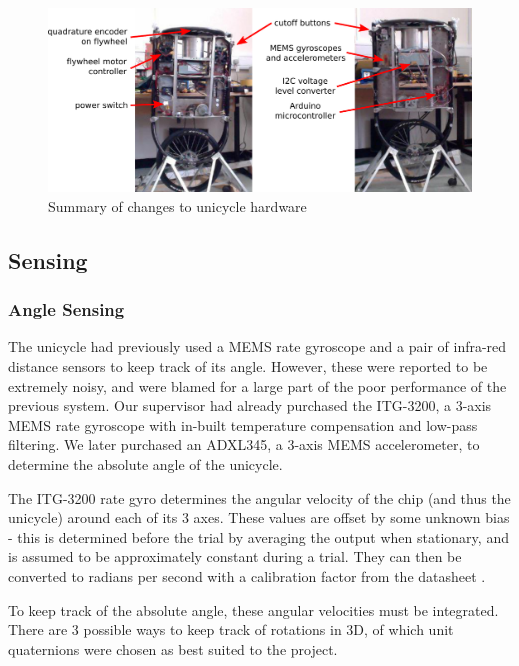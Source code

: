 \documentclass{IIBproject}
\begin{document}
\begin{figure}[htpb]
  \begin{center}
    \includegraphics[width=15cm]{figures/hardware.pdf}
    \end{center}
    \caption{Summary of changes to unicycle hardware}
    \label{fig:hardware}
    \end{figure}

\subsection{Sensing}

\subsubsection{Angle Sensing}

The unicycle had previously used a MEMS rate gyroscope and a pair
of infra-red distance sensors to keep track of its angle. However, these were
reported to be extremely noisy, and were blamed for a large part of the poor
performance of the previous system. Our supervisor had already purchased the
ITG-3200, a 3-axis MEMS rate gyroscope with in-built temperature compensation
and low-pass filtering. We later purchased an ADXL345, a 3-axis MEMS
accelerometer, to determine the absolute angle of the unicycle.

The ITG-3200 rate gyro determines the angular velocity of the chip (and thus
the unicycle) around each of its 3 axes. These values are offset by some
unknown bias - this is determined before the trial by averaging the output
when stationary, and is assumed to be approximately constant during a trial.
They can then be converted to radians per second with a calibration factor
from the datasheet \cite{ref:itg3200}.

To keep track of the absolute angle, these angular velocities must be
integrated. There are 3 possible ways to keep track of rotations in 3D, of
which unit quaternions were chosen as best suited to the project.
\end{document}
